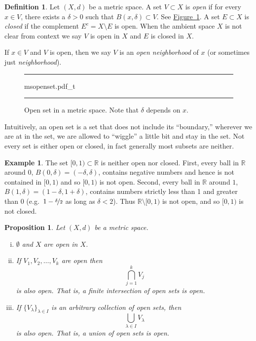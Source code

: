 \documentclass[12pt]{book}
\newenvironment{myfigureht}{%
\begin{figure}[h!t]
\noindent\rule{\textwidth}{0.4pt}\vspace{12pt}\par\centering}%
{\par\noindent\rule{\textwidth}{0.4pt}
\end{figure}}
\newcommand{\R}{{\mathbb{R}}}
\newcommand{\myindex}[1]{#1\index{#1}}
\theoremstyle{plain}
\newtheorem{prop}[thm]{Proposition}
\theoremstyle{remark}
\theoremstyle{definition}
\newtheorem{defn}[thm]{Definition}
\theoremstyle{exercise}
\theoremstyle{example}
\newtheorem{example}[thm]{Example}
\newcommand{\figureref}[1]{\hyperref[#1]{Figure~\ref*{#1}}}
\begin{document}
\begin{defn}
Let $(X,d)$ be a metric space.  A set $V \subset X$
is \emph{open}
if for every $x \in V$, there exists a $\delta > 0$ such that
$B(x,\delta) \subset V$.  See \figureref{fig:msopenset}.  A set $E \subset X$ is 
\emph{closed} if the complement $E^c = X \setminus E$ is open.
When the ambient space $X$ is not clear from context we say
$V$ is open in $X$ and $E$ is closed in $X$.

If $x \in V$ and $V$ is open, then we say 
$V$ is an \emph{\myindex{open neighborhood}} of $x$ (or
sometimes just \emph{\myindex{neighborhood}}).
\end{defn}

\begin{myfigureht}
{msopenset.pdf_t}
\caption{Open set in a metric space.  Note that $\delta$ depends on $x$.\label{fig:msopenset}}
\end{myfigureht}

Intuitively, an open set is a set that does not include its ``boundary,''
wherever we are at in the set, we are allowed to ``wiggle'' a little bit and
stay in the set.
Not every set is either open or closed, in fact generally
most subsets are neither.

\begin{example}
The set $[0,1) \subset \R$ is neither open nor closed.  First,
every ball in $\R$ around $0$, $B(0,\delta) = (-\delta,\delta)$, contains negative
numbers and hence is not contained in $[0,1)$ and so $[0,1)$ is not open.
Second, every ball in $\R$ around $1$,
$B(1,\delta) = (1-\delta,1+\delta)$, contains
numbers strictly less than 1 and greater than 0
(e.g.\ $1-\nicefrac{\delta}{2}$ as long as $\delta < 2$).
Thus $\R \setminus
[0,1)$ is not open, and so $[0,1)$ is not closed.
\end{example}

\begin{prop} \label{prop:topology:open}
Let $(X,d)$ be a metric space.
\begin{enumerate}[(i)]
\item \label{topology:openi} $\emptyset$ and $X$ are open in $X$.
\item \label{topology:openii} If $V_1, V_2, \ldots, V_k$ are open then
\begin{equation*}
\bigcap_{j=1}^k V_j
\end{equation*}
is also open.  That is, a finite intersection of open sets is open.
\item \label{topology:openiii} If $\{ V_\lambda \}_{\lambda \in I}$ is
an arbitrary collection of open sets, then
\begin{equation*}
\bigcup_{\lambda \in I} V_\lambda
\end{equation*}
is also open.  That is, a union of open sets is open.
\end{enumerate}
\end{prop}
\end{document}
